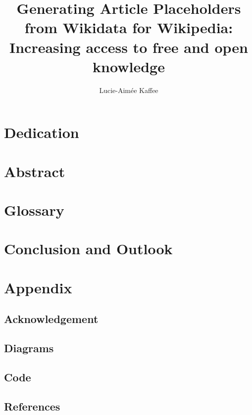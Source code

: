 \documentclass[a4paper, 11pt, oneside]{report}
\title{Generating Article Placeholders from Wikidata for Wikipedia:\\Increasing access to free and open knowledge}
\author{Lucie-Aim\'{e}e Kaffee}
\date{}
\begin{document}
\maketitle
\newpage

\chapter*{Dedication}

\chapter*{Abstract}
\chapter*{Glossary}
\newpage

\tableofcontents




\newpage

\newpage


\chapter{Conclusion and Outlook}
\chapter{Appendix}
	\section{Acknowledgement}
	\section{Diagrams}
	\section{Code}
	\section{References}
\end{document}
